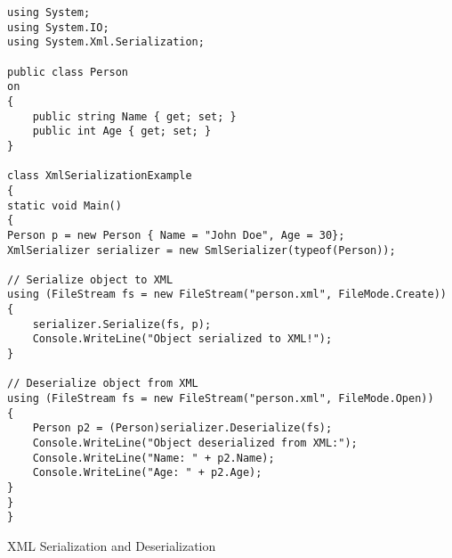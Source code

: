 \begin{listing}[htbp]
\begin{verbatim}
using System;
using System.IO;
using System.Xml.Serialization;

public class Person
on
{
    public string Name { get; set; }
    public int Age { get; set; }
}

class XmlSerializationExample
{
static void Main()
{
Person p = new Person { Name = "John Doe", Age = 30};
XmlSerializer serializer = new SmlSerializer(typeof(Person));

// Serialize object to XML
using (FileStream fs = new FileStream("person.xml", FileMode.Create))
{
    serializer.Serialize(fs, p);
    Console.WriteLine("Object serialized to XML!");
}

// Deserialize object from XML
using (FileStream fs = new FileStream("person.xml", FileMode.Open))
{
    Person p2 = (Person)serializer.Deserialize(fs);
    Console.WriteLine("Object deserialized from XML:");
    Console.WriteLine("Name: " + p2.Name);
    Console.WriteLine("Age: " + p2.Age);
}
}
}
\end{verbatim}
\caption{XML Serialization and Deserialization} 
\label{XMLSerialization}
\end{listing}
